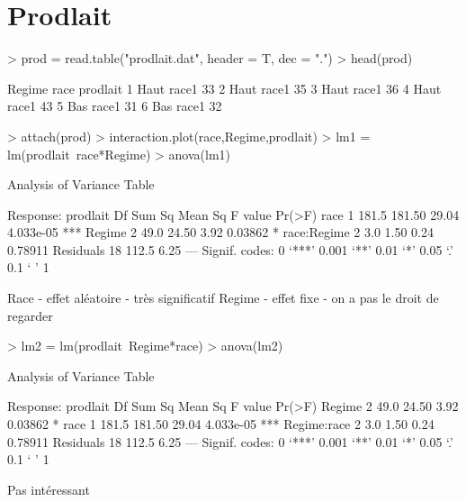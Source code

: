 \documentclass{article}
\begin{document}
\section{Prodlait}
\begin{Schunk}
\begin{Sinput}
> prod = read.table("prodlait.dat", header = T, dec = ".")
> head(prod)
\end{Sinput}
\begin{Soutput}
  Regime  race prodlait
1   Haut race1       33
2   Haut race1       35
3   Haut race1       36
4   Haut race1       43
5    Bas race1       31
6    Bas race1       32
\end{Soutput}
\begin{Sinput}
> attach(prod)
> interaction.plot(race,Regime,prodlait)
> lm1 = lm(prodlait~race*Regime)
> anova(lm1)
\end{Sinput}
\begin{Soutput}
Analysis of Variance Table

Response: prodlait
            Df Sum Sq Mean Sq F value    Pr(>F)    
race         1  181.5  181.50   29.04 4.033e-05 ***
Regime       2   49.0   24.50    3.92   0.03862 *  
race:Regime  2    3.0    1.50    0.24   0.78911    
Residuals   18  112.5    6.25                      
---
Signif. codes:  0 ‘***’ 0.001 ‘**’ 0.01 ‘*’ 0.05 ‘.’ 0.1 ‘ ’ 1
\end{Soutput}
\end{Schunk}
Race - effet aléatoire - très significatif
Regime - effet fixe - on a pas le droit de regarder


\begin{Schunk}
\begin{Sinput}
> lm2 = lm(prodlait~Regime*race)
> anova(lm2)
\end{Sinput}
\begin{Soutput}
Analysis of Variance Table

Response: prodlait
            Df Sum Sq Mean Sq F value    Pr(>F)    
Regime       2   49.0   24.50    3.92   0.03862 *  
race         1  181.5  181.50   29.04 4.033e-05 ***
Regime:race  2    3.0    1.50    0.24   0.78911    
Residuals   18  112.5    6.25                      
---
Signif. codes:  0 ‘***’ 0.001 ‘**’ 0.01 ‘*’ 0.05 ‘.’ 0.1 ‘ ’ 1
\end{Soutput}
\end{Schunk}
Pas intéressant
\end{document}
